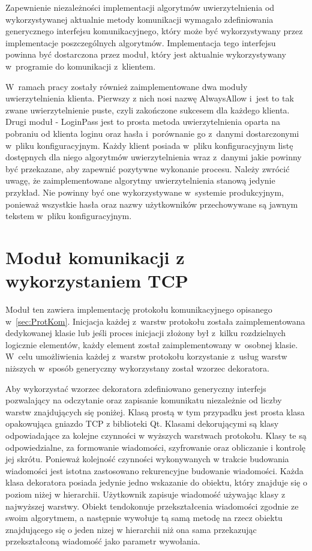 Zapewnienie niezależności implementacji algorytmów uwierzytelnienia od
wykorzystywanej aktualnie metody komunikacji wymagało zdefiniowania
generycznego interfejsu komunikacyjnego, który może być wykorzystywany
przez implementacje poszczególnych algorytmów. Implementacja tego
interfejsu powinna być dostarczona przez moduł, który jest aktualnie
wykorzystywany w~programie do komunikacji z~klientem.

W~ramach pracy zostały również zaimplementowane dwa moduły
uwierzytelnienia klienta. Pierwszy z nich nosi nazwę AlwaysAllow
i~jest to tak zwane uwierzytelnienie puste, czyli zakończone sukcesem
dla każdego klienta. Drugi moduł - LoginPass jest to prosta metoda
uwierzytelnienia oparta na pobraniu od klienta loginu oraz hasła
i~porównanie go z~danymi dostarczonymi w~pliku konfiguracyjnym. Każdy
klient posiada w~pliku konfiguracyjnym listę dostępnych dla niego
algorytmów uwierzytelnienia wraz z~danymi jakie powinny być
przekazane, aby zapewnić pozytywne wykonanie procesu. Należy zwrócić
uwagę, że zaimplementowane algorytmy uwierzytelnienia stanową jedynie
przykład. Nie powinny być one wykorzystywane w~systemie produkcyjnym,
ponieważ wszystkie hasła oraz nazwy użytkowników przechowywane są
jawnym tekstem w~pliku konfiguracyjnym. 

\section[Moduł TCP][Moduł komunikacji z wykorzystaniem TCP]{Moduł komunikacji z wykorzystaniem TCP}

Moduł ten zawiera implementację protokołu komunikacyjnego opisanego
w~\ref{sec:ProtKom}. Inicjacja każdej z~warstw protokołu została
zaimplementowana dedykowanej klasie lub jeśli proces inicjacji złożony
był z~kilku rozdzielnych logicznie elementów, każdy element został
zaimplementowany w~osobnej klasie. W~celu umożliwienia każdej z~warstw
protokołu korzystanie z~usług warstw niższych w~sposób generyczny
wykorzystany został wzorzec dekoratora.

Aby wykorzystać wzorzec dekoratora zdefiniowano generyczny interfejs
pozwalający na odczytanie oraz zapisanie komunikatu niezależnie od
liczby warstw znajdujących się poniżej. Klasą prostą w tym przypadku
jest prosta klasa opakowująca gniazdo TCP z biblioteki Qt. Klasami
dekorującymi są klasy odpowiadające za kolejne czynności w wyższych
warstwach protokołu. Klasy te są odpowiedzialne, za formowanie
wiadomości, szyfrowanie oraz obliczanie i kontrolę jej
skrótu. Ponieważ kolejność czynności wykonywanych w trakcie budowania
wiadomości jest istotna zastosowano rekurencyjne budowanie
wiadomości. Każda klasa dekoratora posiada jedynie jedno wskazanie do
obiektu, który znajduje się o poziom niżej w hierarchii. Użytkownik
zapisuje wiadomość używając klasy z najwyższej warstwy. Obiekt
tendokonuje przekształcenia wiadomości zgodnie ze swoim algorytmem, a
następnie wywołuje tą samą metodę na rzecz obiektu znajdującego się o
jeden nizej w hierarchii niż ona sama przekazując przekształconą
wiadomość jako parametr wywołania.

